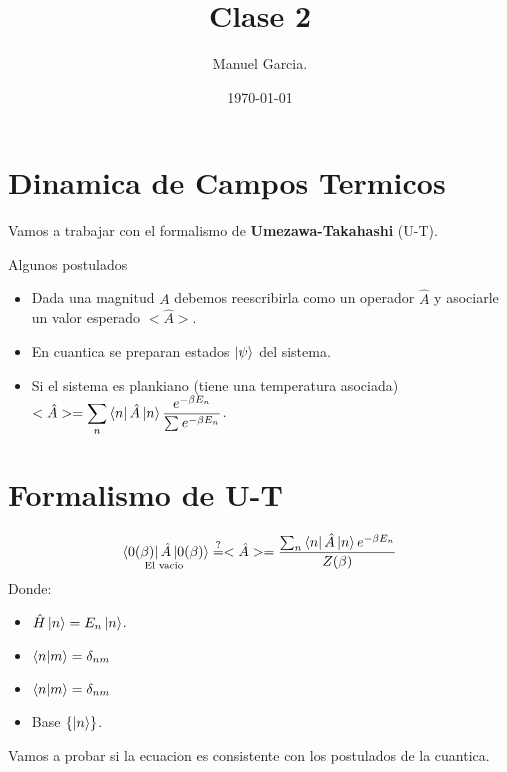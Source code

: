 \documentclass{article}
\title{Clase 2 }
\author{Manuel Garcia.}
\date{\today}
\begin{document}
\maketitle

\section{Dinamica de Campos Termicos}
Vamos a trabajar con el formalismo de \textbf{Umezawa-Takahashi} (U-T).

\hfill 

Algunos postulados 
\begin{itemize}
  \item Dada una magnitud $ A  $ debemos reescribirla como un operador $ \hat A  $ y asociarle un valor esperado $ <\hat A> $.
  \item En cuantica se preparan estados $ \ket{\psi } $ del sistema.
  \item Si el sistema es plankiano (tiene una temperatura asociada) $ <\hat A > = \displaystyle\sum_{n }^{} \bra{n }\hat A \ket{n } \frac{e ^ {-\beta E_n }}{\sum_{}^{}e ^ {-\beta E_n }}  $.
  
\end{itemize}

\section{Formalismo de U-T }
\begin{gather*}
  \underset{\text{El vacio }}{\bra{0(\beta)}\hat A \ket{0(\beta)} } \overset{?}{=}<\hat A > = \frac{\sum_{n }^{} \bra{n }\hat A \ket{n } e ^ {-\beta E_n }   }{Z (\beta )} 
\end{gather*}
Donde: 
\begin{itemize}
  \item $ \hat H \ket{n } = E_n \ket{n } $.
  \item $ \bra{n }\ket{m } = \delta _{nm }   $
  \item $ \bra{n }\ket{m } = \delta _{nm }   $
  \item Base $ \{\ket{n }\} $.
\end{itemize}

Vamos a probar si la ecuacion es consistente con los postulados de la cuantica.
\end{document}
